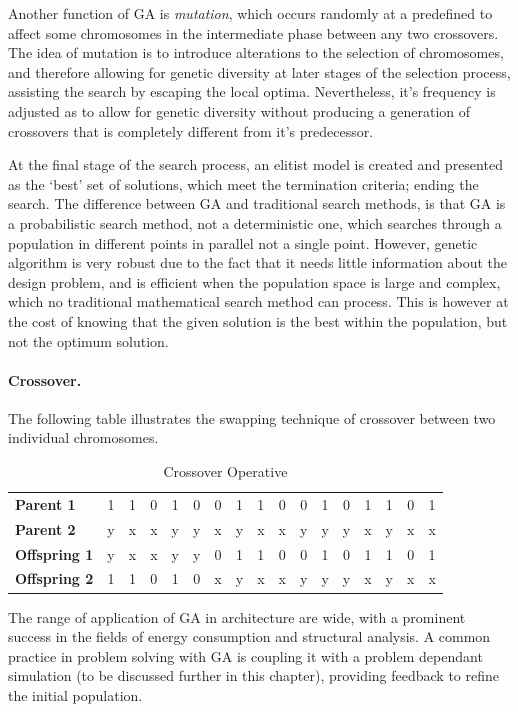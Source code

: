 Another function of GA is \emph{mutation}, which occurs randomly at a predefined to affect some chromosomes in the intermediate phase between any two crossovers. The idea of mutation is to introduce alterations to the selection of chromosomes, and therefore allowing for genetic diversity at later stages of the selection process, assisting the search by escaping the local optima. Nevertheless, it's frequency is adjusted as to allow for genetic diversity without producing a generation of crossovers that is completely different from it's predecessor.

At the final stage of the search process, an elitist model is created and presented as the `best' set of solutions, which meet the termination criteria; ending the search. The difference between GA and traditional  search methods, is that GA is a probabilistic search method, not a deterministic one, which searches through a population in different points in parallel not a single point. However, genetic algorithm is very robust due to the fact that it needs little information about the design problem, and is efficient when the population space is large and complex, which no traditional mathematical search method can process. This is however at the cost of knowing that the given solution is the best within the population, but not the optimum solution.

\paragraph{Crossover.} The following table illustrates the swapping technique of crossover between two individual chromosomes.

\begin{table}[h]
\begin{tabular}{l|| ccccc|ccccccccccc}
\textbf{Parent 1}&1&1&0&1&0&0&1&1&0&0&1&0&1&1&0&1\\
\textbf{Parent 2}&y&x&x&y&y&x&y&x&x&y&y&y&x&y&x&x\\\hline
\textbf{Offspring 1}&y&x&x&y&y&0&1&1&0&0&1&0&1&1&0&1\\
\textbf{Offspring 2}&1&1&0&1&0&x&y&x&x&y&y&y&x&y&x&x\\
\end{tabular}
\caption[Crossover Operative]{Crossover Operative \cite{whitley94}}
\label{CRSOVR}
\end{table}

The range of application of GA in architecture are wide, with a prominent success in the fields of energy consumption and structural analysis. A common practice in problem solving with GA is coupling it with a problem dependant simulation (to be discussed further in this chapter), providing feedback to refine the initial population.

